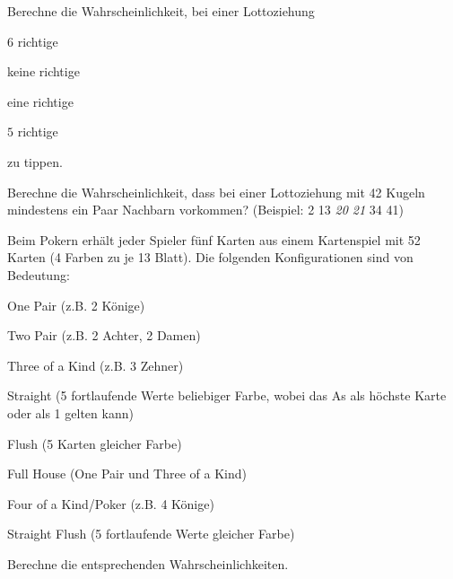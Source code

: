 \documentclass[%
11pt,%
twoside,%
titlepage,%
german,%
headsepline%
]{scrartcl}
\begin{document}
\begin{ueb}[Lotto]
Berechne
die Wahrscheinlichkeit, bei einer Lottoziehung

\begin{minipage}{0.45\textwidth}
\begin{enumeratea}
\item $6$ richtige
\item keine richtige
\end{enumeratea}
\end{minipage}
\begin{minipage}{0.45\textwidth}
\begin{enumeratea}
\setcounter{enumi}{2}
\item eine richtige
\item $5$ richtige
\end{enumeratea}
\end{minipage}

zu tippen.
\end{ueb}

\begin{ueb}
Berechne
die Wahrscheinlichkeit, dass bei einer Lottoziehung mit 42 Kugeln mindestens ein Paar Nachbarn vorkommen? (Beispiel: 2 13 \emph{20 21} 34 41)
\end{ueb}

\begin{ueb}
Beim
Pokern
erhält jeder Spieler fünf Karten aus einem Kartenspiel mit 52 Karten (4 Farben zu je 13 Blatt). Die folgenden Konfigurationen sind von Bedeutung:
\begin{enumeratea}
\item One Pair (z.B. 2 Könige)
\item Two Pair (z.B. 2 Achter, 2 Damen)
\item Three of a Kind (z.B. 3 Zehner)
\item Straight (5 fortlaufende Werte beliebiger Farbe, wobei das As als höchste Karte oder als 1 gelten
kann)
\item Flush (5 Karten gleicher Farbe)
\item Full House (One Pair und Three of a Kind)
\item Four of a Kind/Poker (z.B. 4 Könige)
\item Straight Flush (5 fortlaufende Werte gleicher Farbe)
\end{enumeratea}
Berechne die entsprechenden Wahrscheinlichkeiten.
\end{ueb}
\end{document}
